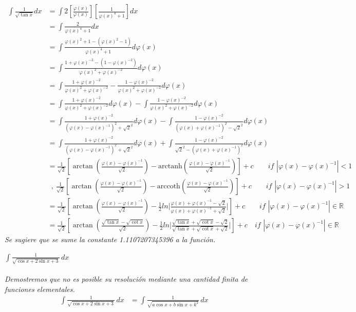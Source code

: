 \documentclass{article}
\newcommand{\ints}{\displaystyle \int \!}
\newcommand{\phix}{\varphi (x)}
\newcommand{\arctanh}{\text{arctanh}}
\newcommand{\arccoth}{\text{arccoth}}
\begin{document}
\begin{align*}
    \ints \frac{1}{\sqrt{\tan x}} dx &=  \ints 2 \left[ \frac{\phix}{\phix} \right] \left[ \frac{1}{\phix^4 + 1} \right] dx \\
    &= \ints \frac{2}{\phix^4 + 1} dx \\
    &= \ints \frac{\phix^2 + 1 - (\phix^2 -1)}{\phix^4 + 1} d\phix \\
    &= \ints \frac{1+\phix^{-2}-(1 - \phix^{-2})}{\phix^2 + \phix^{-2}} d\phix \\
    &= \ints \frac{1+\phix^{-2}}{\phix^2 + \phix^{-2}} - \frac{1 - \phix^{-2}}{\phix^2 + \phix^{-2}} d\phix \\
    &= \ints \frac{1+\phix^{-2}}{\phix^2 + \phix^{-2}} d\phix - \ints \frac{1 - \phix^{-2}}{\phix^2 + \phix^{-2}} d\phix \\
    &= \ints \frac{1+\phix^{-2}}{(\phix - \phix^{-1})^2 + \sqrt{2}^2} d\phix - \ints \frac{1 - \phix^{-2}}{(\phix + \phix^{-1})^2 - \sqrt{2}^2} d\phix \\
    &= \ints \frac{1+\phix^{-2}}{(\phix - \phix^{-1})^2 + \sqrt{2}^2} d\phix + \ints \frac{1 - \phix^{-2}}{\sqrt{2}^2 - (\phix + \phix^{-1})^2} d\phix \\
    &= \frac{1}{\sqrt{2}} \left[ \arctan (\frac{\phix - \phix^{-1}}{\sqrt{2}}) - \arctanh \left( \frac{\phix - \phix^{-1}}{\sqrt{2}} \right) \right] +c \quad \quad \textit{if $|\phix - \phix^{-1}| < 1$ } \\
    &\,\,\, , \ \frac{1}{\sqrt{2}} \left[ \arctan (\frac{\phix - \phix^{-1}}{\sqrt{2}}) - \arccoth \left( \frac{\phix - \phix^{-1}}{\sqrt{2}} \right) \right] +c \quad \quad \textit{if $|\phix - \phix^{-1}| > 1$ } \\
    &= \frac{1}{\sqrt{2}} \left[ \arctan (\frac{\phix - \phix^{-1}}{\sqrt{2}}) - \frac{1}{2}ln \Bigg| \frac{\phix + \phix^{-1} - \sqrt{2}}{\phix + \phix^{-1} + \sqrt{2}} \Bigg| \right] + c \quad \quad \textit{if $|\phix - \phix^{-1}| \in \mathbb{R}$ } \\
    &= \frac{1}{\sqrt{2}} \left[ \arctan (\frac{\sqrt{\tan x} - \sqrt{\cot x}}{\sqrt{2}}) - \frac{1}{2}ln \Bigg| \frac{\sqrt{\tan x} + \sqrt{\cot x} - \sqrt{2}}{\sqrt{\tan x} + \sqrt{\cot x} + \sqrt{2}} \Bigg| \right] + c \quad \textit{if $|\phix - \phix^{-1}| \in \mathbb{R}$ }
\end{align*}
\textit{Se sugiere que se sume la constante 1.1107207345396 a la función.}

\newpage
$\ints \frac{1}{\sqrt{\cos x + 2\sin x + 3}} \, dx$ \\\\
\textit{Demostremos que no es posible su resolución mediante una cantidad finita de funciones elementales.}
\begin{align*}
    \ints \frac{1}{\sqrt{\cos x + 2\sin x + 3}} \, dx &= \ints \frac{1}{\sqrt{a\cos x + b\sin x + k^2}} \, dx
\end{align*}
\end{document}

